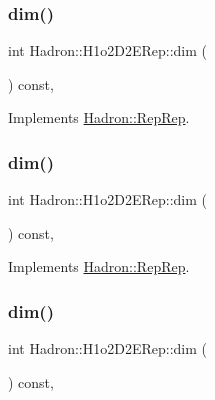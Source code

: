 \subsubsection{\texorpdfstring{dim()}{dim()}\hspace{0.1cm}{\footnotesize\ttfamily [3/5]}}
{\footnotesize\ttfamily int Hadron\+::\+H1o2\+D2\+E\+Rep\+::dim (\begin{DoxyParamCaption}{ }\end{DoxyParamCaption}) const\hspace{0.3cm}{\ttfamily [inline]}, {\ttfamily [virtual]}}



Implements \mbox{\hyperlink{structHadron_1_1RepRep_a92c8802e5ed7afd7da43ccfd5b7cd92b}{Hadron\+::\+Rep\+Rep}}.

\mbox{\label{structHadron_1_1H1o2D2ERep_aeddb45f1ce47ceee776ea1714563280d}} 
\subsubsection{\texorpdfstring{dim()}{dim()}\hspace{0.1cm}{\footnotesize\ttfamily [4/5]}}
{\footnotesize\ttfamily int Hadron\+::\+H1o2\+D2\+E\+Rep\+::dim (\begin{DoxyParamCaption}{ }\end{DoxyParamCaption}) const\hspace{0.3cm}{\ttfamily [inline]}, {\ttfamily [virtual]}}



Implements \mbox{\hyperlink{structHadron_1_1RepRep_a92c8802e5ed7afd7da43ccfd5b7cd92b}{Hadron\+::\+Rep\+Rep}}.

\mbox{\label{structHadron_1_1H1o2D2ERep_aeddb45f1ce47ceee776ea1714563280d}} 
\subsubsection{\texorpdfstring{dim()}{dim()}\hspace{0.1cm}{\footnotesize\ttfamily [5/5]}}
{\footnotesize\ttfamily int Hadron\+::\+H1o2\+D2\+E\+Rep\+::dim (\begin{DoxyParamCaption}{ }\end{DoxyParamCaption}) const\hspace{0.3cm}{\ttfamily [inline]}, {\ttfamily [virtual]}}



